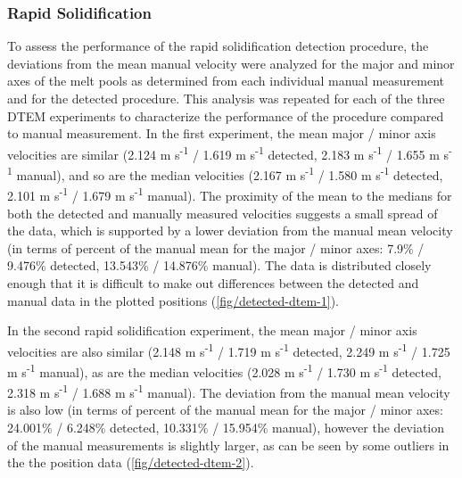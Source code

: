 \subsubsection{Rapid Solidification}
To assess the performance of the rapid solidification detection procedure,
the deviations from the mean manual
velocity were analyzed for the major and minor axes of the melt pools as
determined from each individual manual measurement
and for the detected procedure. This analysis was repeated for each of the
three DTEM experiments to characterize the performance of the procedure
compared to manual measurement.
In the first experiment, the mean major / minor axis velocities
are similar (2.124 m s\textsuperscript{-1} / 1.619 m s\textsuperscript{-1}
detected, 2.183 m s\textsuperscript{-1} / 1.655 m s\textsuperscript{-1} manual),
and so are the median velocities
(2.167 m s\textsuperscript{-1} / 1.580 m s\textsuperscript{-1} detected,
2.101 m s\textsuperscript{-1} / 1.679 m s\textsuperscript{-1} manual).
The proximity of the mean to the medians for both the detected and manually
measured velocities suggests a small spread of the data, which is supported
by a lower deviation from the manual mean velocity (in terms of percent of the
manual mean for the major / minor axes: 7.9\% / 9.476\% detected,
13.543\% / 14.876\% manual). The data is distributed closely enough that it is
difficult to make out differences between the detected and manual data in
the plotted positions (\ref{fig/detected-dtem-1}).

In the second rapid solidification experiment, the mean major / minor axis
velocities are also similar
(2.148 m s\textsuperscript{-1} / 1.719 m s\textsuperscript{-1} detected,
2.249 m s\textsuperscript{-1} / 1.725 m s\textsuperscript{-1} manual),
as are the median velocities
(2.028 m s\textsuperscript{-1} / 1.730 m s\textsuperscript{-1} detected,
2.318 m s\textsuperscript{-1} / 1.688 m s\textsuperscript{-1} manual).
The deviation from the manual mean velocity is also low (in terms of percent
of the manual mean for the major / minor axes:
24.001\% / 6.248\% detected, 10.331\% / 15.954\% manual),
however the deviation of the manual measurements is slightly larger,
as can be seen by some outliers in the the position data
(\ref{fig/detected-dtem-2}).

